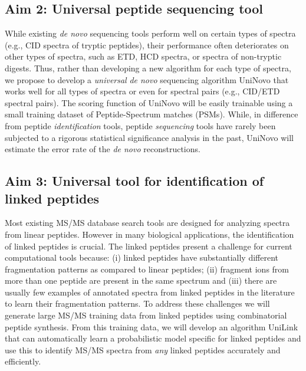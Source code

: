 \subsection{Aim 2: Universal peptide sequencing tool} 

While existing  {\em de novo} sequencing tools perform well on certain types of spectra (e.g., CID spectra of tryptic peptides), their performance often deteriorates on
other types of spectra, such as ETD, HCD spectra, or spectra of non-tryptic digests. Thus, rather than developing a new algorithm for each type of spectra, we propose to  develop  a {\em universal} {\em de novo} sequencing algorithm  UniNovo that works well for all types of spectra or even for spectral pairs (e.g., CID/ETD spectral pairs).  The scoring function of UniNovo will be easily trainable using a small training dataset of Peptide-Spectrum matches (PSMs). 
%
While, in difference from peptide {\em identification} tools,  peptide {\em sequencing} tools have rarely been subjected to a rigorous statistical significance analysis in the past, 
UniNovo will estimate the error rate of the  {\em de novo} reconstructions. 
 


\subsection{Aim 3: Universal tool for identification of linked peptides} 


Most existing MS/MS database search tools are designed for analyzing spectra from linear peptides.  However in many biological applications, the identification of linked peptides is crucial.  The linked peptides  present a challenge for current computational tools because: (i) linked peptides have substantially different fragmentation patterns as compared to linear peptides; (ii) fragment ions from more than one peptide are present in the same spectrum and (iii) there are usually  few examples of annotated spectra from linked peptides in the literature to learn their fragmentation patterns.  To address these challenges we will generate large MS/MS training data from linked peptides using combinatorial peptide synthesis. From this training data, we will develop an algorithm UniLink that can automatically learn a probabilistic model specific for linked peptides and use this to identify MS/MS spectra from \emph{any} linked peptides accurately and efficiently.

